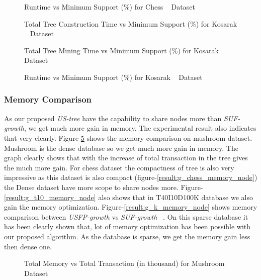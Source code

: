 \documentclass[conference]{IEEEtran}
\begin{document}
            \begin{figure}[h]
            \centering
                
            \caption{Runtime vs Minimum Support (\%) for Chess ~\cite{dataset} Dataset }
            \label{result:g_chess_total}
            \end{figure}
            \begin{figure}[h]
            \centering
                
            \caption{Total Tree Construction Time vs Minimum Support (\%) for Kosarak ~\cite{dataset} Dataset }
            \label{result:g_k_tree_construction_total}
            \end{figure}
            
            \begin{figure}[h]
            \centering
                
            \caption{Total Tree Mining Time vs Minimum Support (\%) for Kosarak ~\cite{dataset} Dataset }
            \label{result:g_k_mining_total}
            \end{figure}

            \begin{figure}[h]
            \centering
                
            \caption{Runtime vs Minimum Support (\%) for Kosarak ~\cite{dataset} Dataset }
            \label{result:g_k_total}
            \end{figure}
            
\subsubsection{Memory Comparison}
As our proposed \emph{US-tree} have the capability to share nodes more than \emph{SUF-growth}, we get much more gain in memory. The experimental result also indicates that very clearly. Figure-\ref{result:g_m_memory_node} shows the memory comparison on mushroom dataset. Mushroom is the dense database so we get  much more gain in memory. The graph clearly shows that with the increase of total transaction in the tree gives the much more gain. For chess dataset the compactness of tree is also very impressive as this dataset is also compact (figure-\ref{result:g_chess_memory_node}) the Dense dataset have more scope to share nodes more. Figure-\ref{result:g_t10_memory_node} also shows that in T40I10D100K database we also gain the memory optimization. Figure-\ref{result:g_k_memory_node} shows memory comparison between \emph{USFP-growth} vs \emph{SUF-growth} ~\cite{suf_growth}. On this sparse database it has been clearly shown that, lot of memory optimization has been possible with our proposed algorithm. As the database is sparse, we get the memory gain less then dense one.
            \begin{figure}[h]
            \centering
                
            \caption{Total Memory vs Total Transaction (in thousand) for Mushroom ~\cite{dataset} Dataset }
            \label{result:g_m_memory_node}
            \end{figure}
            
\end{document}
